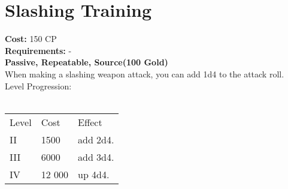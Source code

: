 \section{Slashing Training}
\textbf{Cost:} 150 CP\\
\textbf{Requirements:} -\\
\textbf{Passive, Repeatable, Source(100 Gold)}\\
When making a slashing weapon attack, you can add 1d4 to the attack roll.
\\
Level Progression:\\
\\
\begin{tabular}{l | l | l}
	Level & Cost & Effect\\
	II & 1500 & add 2d4.\\
	III & 6000 & add 3d4.\\
	IV & 12 000 & up 4d4.\\
\end{tabular}